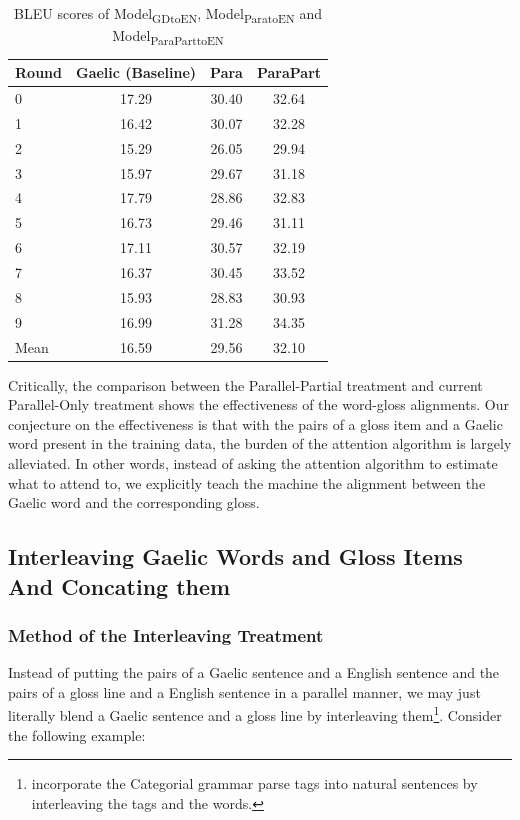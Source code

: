 \documentclass[final]{ua-thesis}
\numberwithin{equation}{section}
\begin{document}
\begin{table}[ht]
\centering
\begin{tabular}{lccc}
  \hline
Round & Gaelic (Baseline) & Para & ParaPart \\ 
  \hline
0 & 17.29 & 30.40 & 32.64 \\ 
  1 & 16.42 & 30.07 & 32.28 \\ 
  2 & 15.29 & 26.05 & 29.94 \\ 
  3 & 15.97 & 29.67 & 31.18 \\ 
  4 & 17.79 & 28.86 & 32.83 \\ 
  5 & 16.73 & 29.46 & 31.11 \\ 
  6 & 17.11 & 30.57 & 32.19 \\ 
  7 & 16.37 & 30.45 & 33.52 \\ 
  8 & 15.93 & 28.83 & 30.93 \\ 
  9 & 16.99 & 31.28 & 34.35 \\ 
   \hline
Mean & 16.59 & 29.56 & 32.10 \\ 
   \hline
\end{tabular}
\caption{BLEU scores of Model\textsubscript{GDtoEN}, Model\textsubscript{ParatoEN} and Model\textsubscript{ParaParttoEN} } 
\label{Table:Concating}
\end{table}
Critically, the comparison between the Parallel-Partial treatment and current Parallel-Only treatment shows the effectiveness of the word-gloss alignments. Our conjecture on the effectiveness is that with the pairs of a gloss item and a Gaelic word present in the training data, the burden of the attention algorithm \citep{bahdanau2014neural} is largely alleviated. In other words, instead of asking the attention algorithm to estimate what to attend to, we explicitly teach the machine the alignment between the Gaelic word and the corresponding gloss. 

\subsection{Interleaving Gaelic Words and Gloss Items And Concating them}\label{treatment:InterleavingAndConCat}
\subsubsection{Method of the Interleaving Treatment}

Instead of putting the pairs of a Gaelic sentence and a English sentence and the pairs of a gloss line and a English sentence in a parallel manner,
we may just literally blend a Gaelic sentence and a gloss line by interleaving them\footnote{\citet{ccg_target_seq} incorporate the Categorial grammar parse tags into natural sentences by interleaving the tags and the words.}. Consider the following example:
\end{document}
